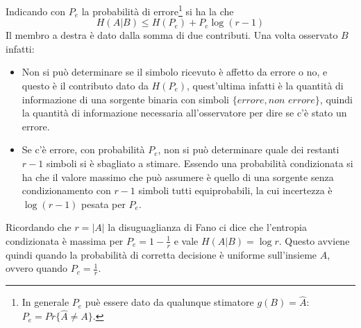 Indicando con $P_e$ la probabilit\`a di errore\footnote{In generale $P_e$ pu\`e essere dato da qualunque stimatore $g(B) = \hat{A}$: $P_e = Pr \{\hat{A} \neq A\}$.} si ha la che 
\begin{equation}
\label{eqn:fano}
    H(A|B) \leq H(P_e) + P_e\log (r-1)
\end{equation}
Il membro a destra \`e dato dalla somma di due contributi. Una volta osservato $B$ infatti:
\begin{itemize}
    \item Non si pu\`o determinare se il simbolo ricevuto è affetto da errore o no, e questo \`e il contributo dato da $H(P_e)$, quest'ultima infatti \`e la quantità di informazione di una sorgente binaria con simboli $\{errore, non$ $errore \}$, quindi la quantità di informazione necessaria all'osservatore per dire se c’è stato un errore.
    \item Se c’è errore, con probabilità $P_e$, non si pu\`o determinare quale dei restanti $r-1$ simboli si \`e sbagliato a stimare. Essendo una probabilit\`a condizionata si ha che il valore massimo che può assumere è quello di una sorgente senza condizionamento con $r-1$ simboli tutti equiprobabili, la cui incertezza \`e $\log (r-1)$ pesata per $P_e$. 
\end{itemize}
Ricordando che $r = |A|$ la disuguaglianza di Fano ci dice che l'entropia condizionata \`e massima per $P_e = 1 - \frac{1}{r}$ e vale $H(A|B) = \log r$. Questo avviene quindi quando la probabilit\`a di corretta decisione \`e uniforme sull'insieme $A$, ovvero quando $P_c = \frac{1}{r}$.

